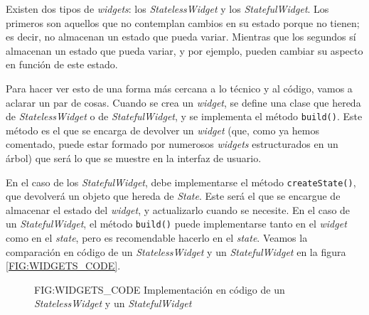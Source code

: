 Existen dos tipos de \textit{widgets}: los \textit{StatelessWidget} y los \textit{StatefulWidget}. Los primeros son aquellos que no contemplan
cambios en su estado porque no tienen; es decir, no almacenan un estado que pueda variar. Mientras que los segundos sí almacenan un estado que pueda
variar, y por ejemplo, pueden cambiar su aspecto en función de este estado.

Para hacer ver esto de una forma más cercana a lo técnico y al código, vamos a aclarar un par de cosas. Cuando se crea un \textit{widget}, se define una clase
que hereda de \textit{StatelessWidget} o de \textit{StatefulWidget}, y se implementa el método \texttt{build()}. Este método es el que se encarga de devolver
un \textit{widget} (que, como ya hemos comentado, puede estar formado por numerosos \textit{widgets} estructurados en un árbol) que será lo que se muestre en 
la interfaz de usuario.

En el caso de los \textit{StatefulWidget}, debe implementarse el método \texttt{createState()}, que devolverá un objeto que hereda de \textit{State}.
Este será el que se encargue de almacenar el estado del \textit{widget}, y actualizarlo cuando se necesite. En el caso de un \textit{StatefulWidget}, el método
\texttt{build()} puede implementarse tanto en el \textit{widget} como en el \textit{state}, pero es recomendable hacerlo en el \textit{state}.
Veamos la comparación en código de un \textit{StatelessWidget} y un \textit{StatefulWidget} en la figura \ref{FIG:WIDGETS_CODE}.

\begin{figure}[Implementación en código de un \textit{StatelessWidget} y un \textit{StatefulWidget}]{FIG:WIDGETS_CODE}
  {Implementación en código de un \textit{StatelessWidget} y un \textit{StatefulWidget}}
   \quad
\end{figure}



